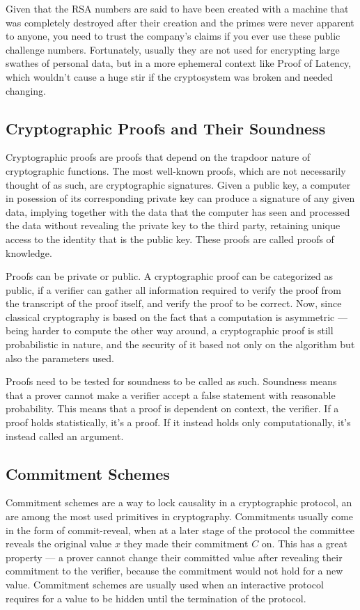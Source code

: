 Given that the RSA numbers are said to have been created with a machine that was completely destroyed after their creation and the primes were never apparent to anyone, you need to trust the company's claims if you ever use these public challenge numbers. Fortunately, usually they are not used for encrypting large swathes of personal data, but in a more ephemeral context like Proof of Latency, which wouldn't cause a huge stir if the cryptosystem was broken and needed changing.

\subsection{Cryptographic Proofs and Their Soundness}
Cryptographic proofs are proofs that depend on the trapdoor nature of cryptographic functions. The most well-known proofs, which are not necessarily thought of as such, are cryptographic signatures. Given a public key, a computer in posession of its corresponding private key can produce a signature of any given data, implying together with the data that the computer has seen and processed the data without revealing the private key to the third party, retaining unique access to the identity that is the public key. These proofs are called proofs of knowledge.

Proofs can be private or public. A cryptographic proof can be categorized as public, if a verifier can gather all information required to verify the proof from the transcript of the proof itself, and verify the proof to be correct. Now, since classical cryptography is based on the fact that a computation is asymmetric --- being harder to compute the other way around, a cryptographic proof is still probabilistic in nature, and the security of it based not only on the algorithm but also the parameters used.

Proofs need to be tested for soundness to be called as such. Soundness means that a prover cannot make a verifier accept a false statement with reasonable probability. This means that a proof is dependent on context, the verifier. If a proof holds statistically, it's a proof. If it instead holds only computationally, it's instead called an argument.


\subsection{Commitment Schemes}
Commitment schemes are a way to lock causality in a cryptographic protocol, an are among the most used primitives in cryptography. Commitments usually come in the form of commit-reveal, when at a later stage of the protocol the committee reveals the original value \(x\) they made their commitment \(C\) on. This has a great property --- a prover cannot change their committed value after revealing their commitment to the verifier, because the commitment would not hold for a new value. Commitment schemes are usually used when an interactive protocol requires for a value to be hidden until the termination of the protocol.

